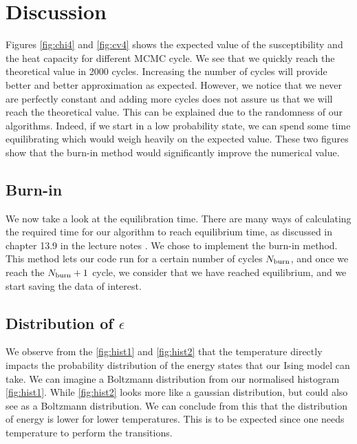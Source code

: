 \documentclass[english,notitlepage,reprint,nofootinbib]{revtex4-2}  %
\begin{document}
	\section{Discussion}\label{sec:discussion}
	Figures \ref{fig:chi4} and \ref{fig:cv4} shows the expected value of the susceptibility
	and the heat capacity for different MCMC cycle. We see that we quickly reach the theoretical
	value in 2000 cycles. Increasing the number of cycles will provide better and better
	approximation as expected. However, we notice that we never are perfectly constant and adding
	more cycles does not assure us that we will reach the theoretical value. This
	can be explained due to the randomness of our algorithms. Indeed, if we start in a low probability state, we can spend some time equilibrating which would weigh heavily on the
	expected value. These two figures show that the burn-in method would significantly improve
	the numerical value.


	\subsection{Burn-in}\label{subsec:dis burnin}

	We now take a look at the equilibration time. There are many ways of calculating the required
	time for our algorithm to reach equilibrium time, as discussed in chapter 13.9 in the lecture notes \cite{Morten15}. We chose
	to implement the burn-in method. This method lets our code run for a certain number
	of cycles $N_{\rm burn}$, and once we reach the $N_{\rm burn} + 1$ cycle, we consider that we have reached equilibrium, and we start saving the data of interest.


	\subsection{Distribution of $\epsilon$}\label{subsec:dis epsilon}
	We observe from the \autoref{fig:hist1} and \autoref{fig:hist2} that the temperature directly impacts the probability distribution of the energy states that our Ising model can take.
	We can imagine a Boltzmann distribution from our normalised histogram \autoref{fig:hist1}.
	While \autoref{fig:hist2} looks more like a gaussian distribution, but could also see as a Boltzmann distribution.
	We can conclude from this that the distribution of energy is lower for lower temperatures.
	This is to be expected since one needs temperature to perform the transitions.
\end{document}
